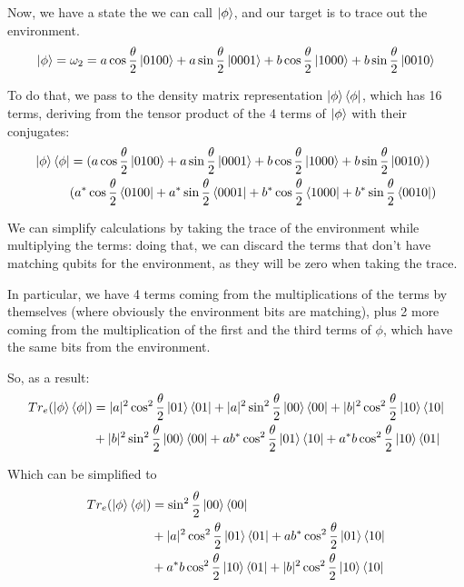 \documentclass{masterthesis}
\begin{document}
Now, we have a state the we can call $\ket{\phi}$, and our target is to trace out the environment.
\begin{equation}
    \ket{\phi} = \omega_2 = a\cos\frac{\theta}{2}\ket{0100} + a\sin\frac{\theta}{2}\ket{0001} + b\cos\frac{\theta}{2}\ket{1000} + b\sin\frac{\theta}{2}\ket{0010}
\end{equation}

To do that, we pass to the density matrix representation $\ket{\phi}\bra{\phi}$, which has 16 terms, deriving from the tensor product of the 4 terms of $\ket{\phi}$ with their conjugates:
\begin{align}
    \ket{\phi}\bra{\phi} &= (a\cos\frac{\theta}{2}\ket{0100} + a\sin\frac{\theta}{2}\ket{0001} + b\cos\frac{\theta}{2}\ket{1000} + b\sin\frac{\theta}{2}\ket{0010}) \nonumber \\
    &(a^{*}\cos\frac{\theta}{2}\bra{0100} + a^{*}\sin\frac{\theta}{2}\bra{0001} + b^{*}\cos\frac{\theta}{2}\bra{1000} + b^{*}\sin\frac{\theta}{2}\bra{0010})
\end{align}

We can simplify calculations by taking the trace of the environment while multiplying the terms: doing that, we can discard the terms that don't have matching qubits for the environment, as they will be zero when taking the trace.

In particular, we have 4 terms coming from the multiplications of the terms by themselves (where obviously the environment bits are matching), plus 2 more coming from the multiplication of the first and the third terms of $\phi$, which have the same bits from the environment.

So, as a result:
\begin{align}
    Tr_e(\ket{\phi}\bra{\phi}) &= |a|^2 \cos^2 \frac{\theta}{2}\ket{01}\bra{01} + |a|^2 \sin^2 \frac{\theta}{2}\ket{00}\bra{00} + |b|^2 \cos^2 \frac{\theta}{2}\ket{10}\bra{10} \\
    & + |b|^2 \sin^2 \frac{\theta}{2}\ket{00}\bra{00} + a b^{*} \cos^2 \frac{\theta}{2} \ket{01}\bra{10} + a^{*} b \cos^2 \frac{\theta}{2} \ket{10}\bra{01} 
\end{align}

Which can be simplified to 
\begin{align}
    Tr_e(\ket{\phi}\bra{\phi}) &= \sin^2 \frac{\theta}{2}\ket{00}\bra{00} \\ 
    & + |a|^2 \cos^2 \frac{\theta}{2}\ket{01}\bra{01} + a b^{*} \cos^2 \frac{\theta}{2} \ket{01}\bra{10} \\
    & + a^{*} b \cos^2 \frac{\theta}{2} \ket{10}\bra{01} + |b|^2 \cos^2 \frac{\theta}{2}\ket{10}\bra{10}
\end{align}
\end{document}
